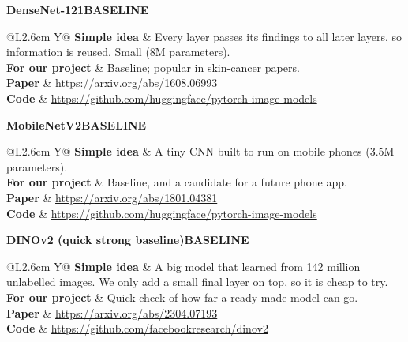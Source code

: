 \documentclass[11pt,a4paper]{article}
\makeatletter
\newcommand{\acard}[6]{%
\par\medskip\noindent
\colorbox{boxBg}{\parbox{\dimexpr\linewidth-2\fboxsep}{%
{\large\bfseries\color{hcBlue}#1}\hfill{\small #2}\\[3pt]
\begin{tabularx}{\linewidth}{@{}L{2.6cm} Y@{}}
\textbf{Simple idea} & #3 \\
\textbf{For our project} & #4 \\
\textbf{Paper} & \url{#5} \\
\textbf{Code} & \url{#6} \\
\end{tabularx}}}\par}
\newcommand{\base}{\colorbox{hcBlue!15}{\textbf{BASELINE}}}
\makeatother
\begin{document}
\acard{DenseNet-121}{\base}
{Every layer passes its findings to all later layers, so information is
reused. Small (8M parameters).}
{Baseline; popular in skin-cancer papers.}
{https://arxiv.org/abs/1608.06993}
{https://github.com/huggingface/pytorch-image-models}

\acard{MobileNetV2}{\base}
{A tiny CNN built to run on mobile phones (3.5M parameters).}
{Baseline, and a candidate for a future phone app.}
{https://arxiv.org/abs/1801.04381}
{https://github.com/huggingface/pytorch-image-models}

\acard{DINOv2 (quick strong baseline)}{\base}
{A big model that learned from 142 million unlabelled images. We only
add a small final layer on top, so it is cheap to try.}
{Quick check of how far a ready-made model can go.}
{https://arxiv.org/abs/2304.07193}
{https://github.com/facebookresearch/dinov2}

\end{document}
